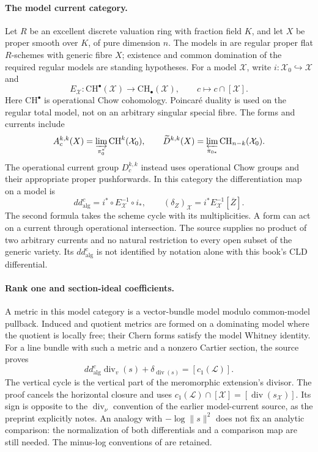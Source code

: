 \paragraph{The model current category.}
Let \(R\) be an excellent discrete valuation ring with fraction field
\(K\), and let \(X\) be proper smooth over \(K\), of pure dimension
\(n\). The models in \cite[\S1]{Dubocs26GreenV1} are regular proper
flat \(R\)-schemes with generic fibre \(X\); existence and common
domination of the required regular models are standing hypotheses.
For a model \(\mathcal X\), write \(i:\mathcal X_0\hookrightarrow
\mathcal X\) and
\[
 E_{\mathcal X}:\mathrm{CH}^\bullet(\mathcal X)
 \longrightarrow \mathrm{CH}_\bullet(\mathcal X),
 \qquad c\longmapsto c\cap[\mathcal X].
\]
Here \(\mathrm{CH}^\bullet\) is operational Chow cohomology.
Poincar\'e duality is used on the regular total model, not on an
arbitrary singular special fibre. The forms and currents include
\[
 A_c^{k,k}(X)=\varinjlim_{\pi_0^*}\mathrm{CH}^k(\mathcal X_0),
 \qquad
 \widetilde D^{k,k}(X)
   =\varprojlim_{\pi_{0*}}\mathrm{CH}_{n-k}(\mathcal X_0).
\]
The operational current group \(D_c^{k,k}\) instead uses
operational Chow groups and their appropriate proper pushforwards.
In this category the differentiation map on a model is
\[
 dd^c_{\mathrm{alg}}
 =i^*\circ E_{\mathcal X}^{-1}\circ i_*,
 \qquad
 (\delta_Z)_{\mathcal X}
 =i^*E_{\mathcal X}^{-1}[\overline Z].
\]
The second formula takes the scheme cycle with its multiplicities.
A form can act on a current through operational intersection.
The source supplies no product of two arbitrary currents and no
natural restriction to every open subset of the generic variety.
Its \(dd^c_{\mathrm{alg}}\) is not identified by notation alone
with this book's CLD differential.

\paragraph{Rank one and section-ideal coefficients.}
A metric in this model category is a vector-bundle model modulo
common-model pullback. Induced and quotient metrics are formed on a
dominating model where the quotient is locally free; their Chern
forms satisfy the model Whitney identity. For a line bundle with
such a metric and a nonzero Cartier section, the source proves
\cite[Proposition~2.6]{Dubocs26GreenV1}
\[
 dd^c_{\mathrm{alg}}\operatorname{div}_v(s)
 +\delta_{\operatorname{div}(s)}
 =[c_1(\mathcal L)].
\]
The vertical cycle is the vertical part of the meromorphic extension's
divisor. The proof cancels the horizontal closure and uses
\(c_1(\mathcal L)\cap[\mathcal X]
=[\operatorname{div}(s_{\mathcal X})]\).
Its sign is opposite to the \(\operatorname{div}_\nu\) convention
of the earlier model-current source, as the preprint explicitly notes.
An analogy with \(-\log\|s\|^2\) does not fix an analytic comparison:
the normalization of both differentials and a comparison map are
still needed. The minus-log conventions of
 are retained.

